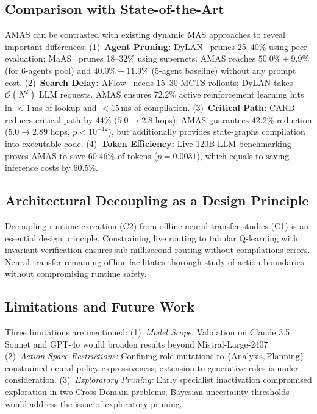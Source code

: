 ﻿\documentclass[conference]{IEEEtran}
\begin{document}
\subsection{Comparison with State-of-the-Art}
AMAS can be contrasted with existing dynamic MAS approaches to reveal important differences:
(1)~\textbf{Agent Pruning:} DyLAN~\cite{liu2024dylan} prunes 25--40\% using peer evaluation; MaAS~\cite{Zhang2025MaAS} prunes 18--32\% using supernets. AMAS reaches $\mathbf{50.0\% \pm 9.9\%}$ (for 6-agents pool) and $\mathbf{40.0\% \pm 11.9\%}$ (5-agent baseline) without any prompt cost.
(2)~\textbf{Search Delay:} AFlow~\cite{zhang2024aflow} needs 15--30 MCTS rollouts; DyLAN takes $\mathcal{O}(N^2)$ LLM requests. AMAS ensures 72.2\% active reinforcement learning hits in $<1$\,ms of lookup and $<15$\,ms of compilation.
(3)~\textbf{Critical Path:} CARD~\cite{Li2025AdaptiveGraphPruning} reduces critical path by 44\% ($5.0 \to 2.8$ hops); AMAS guarantees 42.2\% reduction ($5.0 \to 2.89$ hops, $p < 10^{-12}$), but additionally provides state-graphs compilation into executable code.
(4)~\textbf{Token Efficiency:} Live 120B LLM benchmarking proves AMAS to save 60.46\% of tokens ($p = 0.0031$), which equals to saving inference costs by 60.5\%.

\subsection{Architectural Decoupling as a Design Principle}
Decoupling runtime execution (C2) from offline neural transfer studies (C1) is an essential design principle. Constraining live routing to tabular Q-learning with invariant verification ensures sub-millisecond routing without compilations errors. Neural transfer remaining offline facilitates thorough study of action boundaries without compromising runtime safety.

\subsection{Limitations and Future Work}
Three limitations are mentioned: (1)~\textit{Model Scope:} Validation on Claude 3.5 Sonnet and GPT-4o would broaden results beyond Mistral-Large-2407. (2)~\textit{Action Space Restrictions:} Confining role mutations to $\{\text{Analysis}, \text{Planning}\}$ constrained neural policy expressiveness; extension to generative roles is under consideration. (3)~\textit{Exploratory Pruning:} Early specialist inactivation compromised exploration in two Cross-Domain problems; Bayesian uncertainty thresholds would address the issue of exploratory pruning.
\end{document}
